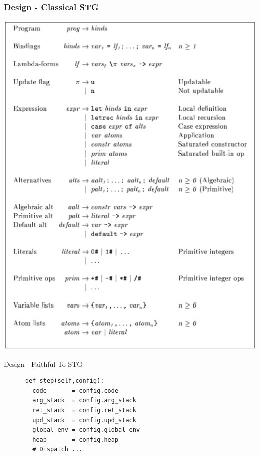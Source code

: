 \documentclass[xetex,serif,mathserif]{beamer}
\newenvironment{slide}[1]{\begin{frame}\frametitle{#1}}{\end{frame}}
\begin{document}
\begin{slide}{Design - Classical STG}
  \begin{center}
  \includegraphics[scale=0.3]{stg-def}
  \end{center}
\end{slide}

\begin{frame}[fragile]{Design - Faithful To STG}
  \begin{center}
    \begin{verbatim}
      def step(self,config):
        code       = config.code
        arg_stack  = config.arg_stack
        ret_stack  = config.ret_stack
        upd_stack  = config.upd_stack
        global_env = config.global_env
        heap       = config.heap
        # Dispatch ...
    \end{verbatim}
  \end{center}
\end{frame}
\end{document}
